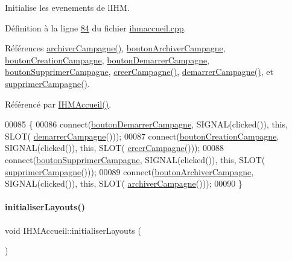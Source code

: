 Initialise les evenements de l\textquotesingle{}I\+HM. 



Définition à la ligne \hyperlink{ihmaccueil_8cpp_source_l00084}{84} du fichier \hyperlink{ihmaccueil_8cpp_source}{ihmaccueil.\+cpp}.



Références \hyperlink{ihmaccueil_8cpp_source_l00350}{archiver\+Campagne()}, \hyperlink{ihmaccueil_8h_source_l00035}{bouton\+Archiver\+Campagne}, \hyperlink{ihmaccueil_8h_source_l00033}{bouton\+Creation\+Campagne}, \hyperlink{ihmaccueil_8h_source_l00034}{bouton\+Demarrer\+Campagne}, \hyperlink{ihmaccueil_8h_source_l00036}{bouton\+Supprimer\+Campagne}, \hyperlink{ihmaccueil_8cpp_source_l00339}{creer\+Campagne()}, \hyperlink{ihmaccueil_8cpp_source_l00323}{demarrer\+Campagne()}, et \hyperlink{ihmaccueil_8cpp_source_l00375}{supprimer\+Campagne()}.



Référencé par \hyperlink{ihmaccueil_8cpp_source_l00014}{I\+H\+M\+Accueil()}.


\begin{DoxyCode}
00085 \{
00086     connect(\hyperlink{class_i_h_m_accueil_a9fd8ab3abc0c1e6addd70c8d7c46fb65}{boutonDemarrerCampagne}, SIGNAL(clicked()), \textcolor{keyword}{this}, SLOT(
      \hyperlink{class_i_h_m_accueil_a6e8935ff4e0ba8f0c0015f370d91eda3}{demarrerCampagne}()));
00087     connect(\hyperlink{class_i_h_m_accueil_a4186b4ef6a9c63f5b3c6431626ff3268}{boutonCreationCampagne}, SIGNAL(clicked()), \textcolor{keyword}{this}, SLOT(
      \hyperlink{class_i_h_m_accueil_a1da45b17d6e4198f87a9a0e05d1f7fd5}{creerCampagne}()));
00088     connect(\hyperlink{class_i_h_m_accueil_afb409fb4395372f35f9f8699fcb4c89b}{boutonSupprimerCampagne}, SIGNAL(clicked()), \textcolor{keyword}{this}, SLOT(
      \hyperlink{class_i_h_m_accueil_a0d7c77277fe83ad13beee56d96c5c5ca}{supprimerCampagne}()));
00089     connect(\hyperlink{class_i_h_m_accueil_a96d64cf254c0645eb45c317858b0a0f3}{boutonArchiverCampagne}, SIGNAL(clicked()), \textcolor{keyword}{this}, SLOT(
      \hyperlink{class_i_h_m_accueil_a5d38917dbe88751ee966834e1f6c558e}{archiverCampagne}()));
00090 \}
\end{DoxyCode}
\mbox{\label{class_i_h_m_accueil_acaaa5d756165801403ea7d73ae40186b}} 
\paragraph{\texorpdfstring{initialiser\+Layouts()}{initialiserLayouts()}}
{\footnotesize\ttfamily void I\+H\+M\+Accueil\+::initialiser\+Layouts (\begin{DoxyParamCaption}{ }\end{DoxyParamCaption})\hspace{0.3cm}{\ttfamily [private]}}



